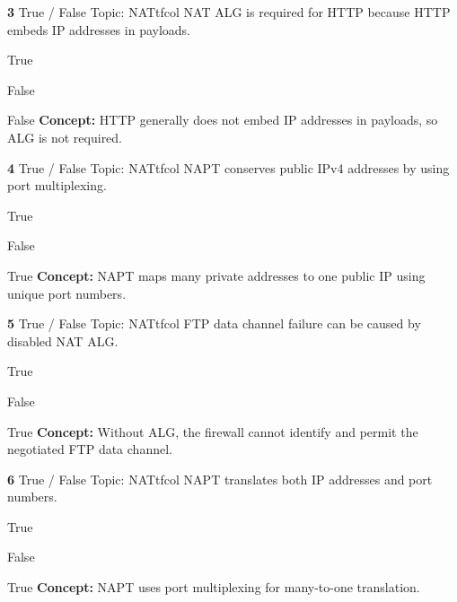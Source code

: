 \documentclass[10pt,a4paper]{article}
\begin{document}
\begin{qcard}{\color{white}\textbf{3} \hfill \small True / False \textbar{} Topic: NAT}{tfcol}
NAT ALG is required for HTTP because HTTP embeds IP addresses in payloads.

\begin{qoptions}
\item True
\item False
\end{qoptions}
\begin{explainbox}{False}
\textbf{Concept:} HTTP generally does not embed IP addresses in payloads, so ALG is not required.
\end{explainbox}
\end{qcard}

\begin{qcard}{\color{white}\textbf{4} \hfill \small True / False \textbar{} Topic: NAT}{tfcol}
NAPT conserves public IPv4 addresses by using port multiplexing.

\begin{qoptions}
\item True
\item False
\end{qoptions}
\begin{explainbox}{True}
\textbf{Concept:} NAPT maps many private addresses to one public IP using unique port numbers.
\end{explainbox}
\end{qcard}

\begin{qcard}{\color{white}\textbf{5} \hfill \small True / False \textbar{} Topic: NAT}{tfcol}
FTP data channel failure can be caused by disabled NAT ALG.

\begin{qoptions}
\item True
\item False
\end{qoptions}
\begin{explainbox}{True}
\textbf{Concept:} Without ALG, the firewall cannot identify and permit the negotiated FTP data channel.
\end{explainbox}
\end{qcard}

\begin{qcard}{\color{white}\textbf{6} \hfill \small True / False \textbar{} Topic: NAT}{tfcol}
NAPT translates both IP addresses and port numbers.

\begin{qoptions}
\item True
\item False
\end{qoptions}
\begin{explainbox}{True}
\textbf{Concept:} NAPT uses port multiplexing for many-to-one translation.
\end{explainbox}
\end{qcard}
\end{document}
